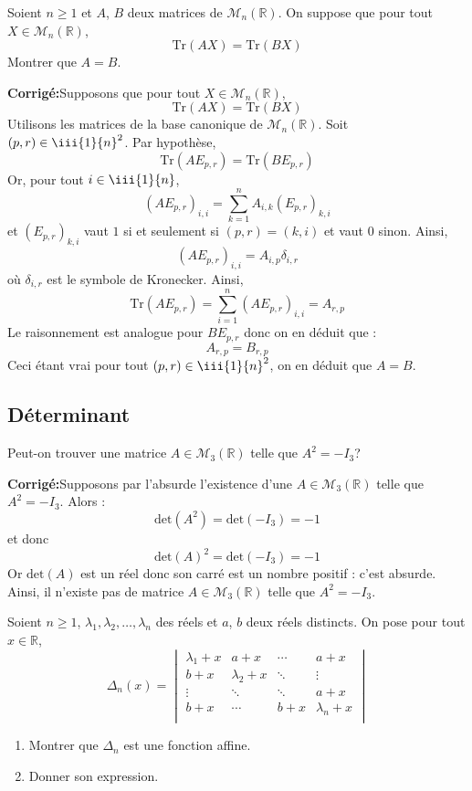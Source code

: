 \documentclass[a4paper,twoside,french,11pt]{VcCours}
\newcommand{\corr}{\textbf{Corrigé:}}
\begin{document}
\begin{Exercice}{} Soient $n \geq 1$ et $A$, $B$ deux matrices de $\mathcal{M}_n(\mathbb{R})$. On suppose que pour tout $X \in \mathcal{M}_n(\mathbb{R})$, 
$$\textrm{Tr}(AX)= \textrm{Tr}(BX)$$
Montrer que $A=B$.
\end{Exercice}

\corr Supposons que pour tout $X \in \mathcal{M}_n(\mathbb{R})$, 
$$\textrm{Tr}(AX)= \textrm{Tr}(BX)$$
Utilisons les matrices de la base canonique de $\mathcal{M}_n(\mathbb{R})$. Soit $(p,r) \in \iii{1}{n}^2$. Par hypothèse,
$$ \textrm{Tr}(AE_{p,r})= \textrm{Tr}(BE_{p,r})$$
Or, pour tout $i \in \iii{1}{n}$,
$$ (A E_{p,r})_{i,i} = \sum_{k=1}^n A_{i,k} (E_{p,r})_{k,i} $$
et $(E_{p,r})_{k,i}$ vaut $1$ si et seulement si $(p,r)=(k,i)$ et vaut $0$ sinon. Ainsi,
$$ (A E_{p,r})_{i,i} = A_{i,p} \delta_{i,r}$$
où $\delta_{i,r}$ est le symbole de Kronecker. Ainsi,
 $$ \textrm{Tr}(AE_{p,r}) = \sum_{i=1}^n (A E_{p,r})_{i,i} = A_{r,p}$$
 Le raisonnement est analogue pour $B E_{p,r}$ donc on en déduit que :
 $$ A_{r,p}= B_{r,p}$$
 Ceci étant vrai pour tout $(p,r) \in \iii{1}{n}^2$, on en déduit que $A=B$.





\subsection{\large Déterminant}




\begin{Exercice}{} Peut-on trouver une matrice $A \in \mathcal{M}_3(\mathbb{R})$ telle que $A^2= - I_3$?
\end{Exercice}

\corr Supposons par l'absurde l'existence d'une $A \in \mathcal{M}_3(\mathbb{R})$ telle que $A^2= - I_3$. Alors :
$$ \textrm{det}(A^2) = \textrm{det}(-I_3) = - 1$$
et donc 
$$ \textrm{det}(A)^2 = \textrm{det}(-I_3) = - 1$$
Or $\textrm{det}(A)$ est un réel donc son carré est un nombre positif : c'est absurde. Ainsi, il n'existe pas de matrice $A \in \mathcal{M}_3(\mathbb{R})$ telle que $A^2= - I_3$.



\begin{Exercice}{} Soient $n \geq 1$, $\lambda_1 ,\lambda_2 ,\ldots,\lambda_n$ des réels et $a$, $b$ deux réels distincts. On pose pour tout $x \in \mathbb{R}$,
    \[
    \Delta_n(x) =
    \begin{vmatrix}
        {\lambda_1 + x} & {a + x} & \cdots & {a + x} \\
        {b + x} & {\lambda_2 + x} & \ddots & \vdots \\
        \vdots & \ddots & \ddots & {a + x} \\
        {b + x} & \cdots & {b + x} & {\lambda_n + x} \\
    \end{vmatrix}    
    \]
    \begin{enumerate}
      \item Montrer que $\Delta_n$ est une fonction affine.
      \item Donner son expression.
    \end{enumerate}
\end{Exercice}
\end{document}
